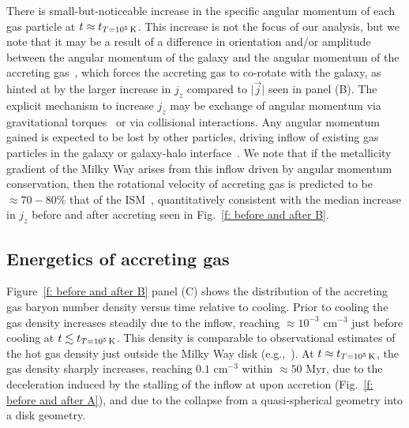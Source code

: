 \documentclass[fleqn,usenatbib]{mnras}
\newcommand{\tcon}{t_{T=10^5\,{\rm K}}}
\begin{document}
There is small-but-noticeable increase in the specific angular momentum of each gas particle at $t \approx \tcon$.
This increase is not the focus of our analysis, but we note that it may be a result of a difference in orientation and/or amplitude between the angular momentum of the galaxy and the angular momentum of the accreting gas~\citep[e.g.][]{Danovich2012, DeFelippis2017}, which forces the accreting gas to co-rotate with the galaxy, as hinted at by the larger increase in $j_z$ compared to $\vert \vec j \vert$ seen in panel (B).
The explicit mechanism to increase $j_z$ may be exchange of angular momentum via gravitational torques~\citep[e.g.][]{Danovich2015} or via collisional interactions.
Any angular momentum gained is expected to be lost by other particles, driving inflow of existing gas particles in the galaxy or galaxy-halo interface~\citep[e.g.][]{Mayor1981, Pezzulli2017}.
We note that if the metallicity gradient of the Milky Way arises from this inflow driven by angular momentum conservation, then the rotational velocity of accreting gas is predicted to be $\approx 70-80\%$ that of the ISM~\citep{Pezzulli2016a}, quantitatively consistent with the median increase in $j_z$ before and after accreting seen in Fig.~\ref{f: before and after B}.

\subsection{Energetics of accreting gas}
\label{s: mechanics -- energy balance}

Figure~\ref{f: before and after B} panel (C) shows the distribution of the accreting gas baryon number density  versus time relative to cooling. Prior to cooling the gas density increases steadily due to the inflow, reaching $\approx10^{-3}$ cm$^{-3}$ just before cooling at $t\lesssim\tcon$. This density is comparable to observational estimates of the hot gas density just outside the Milky Way disk (e.g.,~\cite{LiBregman2017}). At $t\approx\tcon$, the gas density sharply increases, reaching $0.1$ cm$^{-3}$ within $\approx50$ Myr, due to the deceleration induced by the stalling of the inflow at upon accretion (Fig.~\ref{f: before and after A}), and due to the collapse from a quasi-spherical geometry into a disk geometry. 
\end{document}
